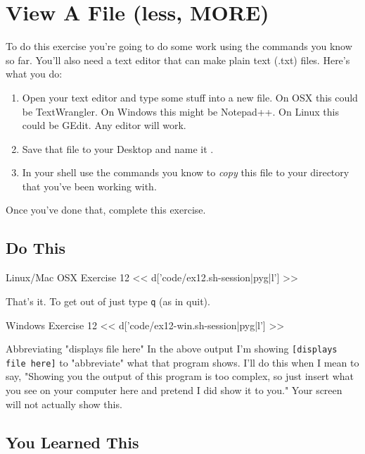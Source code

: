 \chapter{View A File (less, MORE)}

To do this exercise you're going to do some work using the commands you know so far.
You'll also need a text editor that can make plain text (.txt) files.  Here's
what you do:

\begin{enumerate}
\item Open your text editor and type some stuff into a new file. On OSX this could be TextWrangler.  On Windows this might be Notepad++.  On Linux this could be GEdit.  Any editor will work.
\item Save that file to your Desktop and name it .
\item In your shell use the commands you know to \emph{copy} this file
    to your  directory that you've been working with.
\end{enumerate}

Once you've done that, complete this exercise.

\section{Do This}

\begin{code}{Linux/Mac OSX Exercise 12}
<< d['code/ex12.sh-session|pyg|l'] >>
\end{code}

That's it. To get out of  just type \verb|q| (as in quit).

\begin{code}{Windows Exercise 12}
<< d['code/ex12-win.sh-session|pyg|l'] >>
\end{code}

\begin{aside}{Abbreviating "displays file here"}
In the above output I'm showing \verb|[displays file here]| to "abbreviate" what that program shows.
I'll do this when I mean to say, "Showing you the output of this program is too complex, so just insert
what you see on your computer here and pretend I did show it to you."  Your screen will not actually
show this.
\end{aside}

\section{You Learned This}

